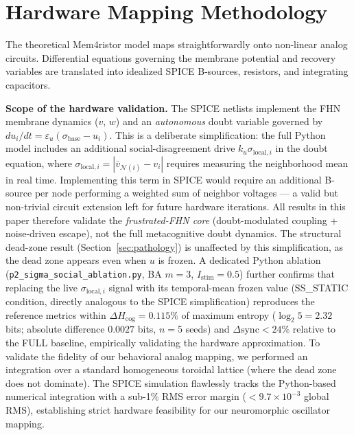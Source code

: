 \documentclass[11pt,a4paper]{article}
\begin{document}
\section{Hardware Mapping Methodology}
\label{sec:methods}
The theoretical Mem4ristor model maps straightforwardly onto non-linear analog circuits. Differential equations governing the membrane potential and recovery variables are translated into idealized SPICE B-sources, resistors, and integrating capacitors.

\textbf{Scope of the hardware validation.} The SPICE netlists implement the FHN membrane dynamics ($v$, $w$) and an \emph{autonomous} doubt variable governed by $du_i/dt = \varepsilon_u(\sigma_{\text{base}} - u_i)$. This is a deliberate simplification: the full Python model includes an additional social-disagreement drive $k_u \sigma_{\text{local},i}$ in the doubt equation, where $\sigma_{\text{local},i} = |\bar{v}_{\mathcal{N}(i)} - v_i|$ requires measuring the neighborhood mean in real time. Implementing this term in SPICE would require an additional B-source per node performing a weighted sum of neighbor voltages --- a valid but non-trivial circuit extension left for future hardware iterations. All results in this paper therefore validate the \emph{frustrated-FHN core} (doubt-modulated coupling + noise-driven escape), not the full metacognitive doubt dynamics. The structural dead-zone result (Section~\ref{sec:pathology}) is unaffected by this simplification, as the dead zone appears even when $u$ is frozen. A dedicated Python ablation (\texttt{p2\_sigma\_social\_ablation.py}, BA $m=3$, $I_{\mathrm{stim}}=0.5$) further confirms that replacing the live $\sigma_{\mathrm{local},i}$ signal with its temporal-mean frozen value (SS\_STATIC condition, directly analogous to the SPICE simplification) reproduces the reference metrics within $\Delta H_{\mathrm{cog}} = 0.115\%$ of maximum entropy ($\log_2 5 = 2.32$ bits; absolute difference $0.0027$ bits, $n=5$ seeds) and $\Delta\mathrm{sync} < 24\%$ relative to the FULL baseline, empirically validating the hardware approximation.
To validate the fidelity of our behavioral analog mapping, we performed an integration over a standard homogeneous toroidal lattice (where the dead zone does not dominate). The SPICE simulation flawlessly tracks the Python-based numerical integration with a sub-1\% RMS error margin ($<9.7\times 10^{-3}$ global RMS), establishing strict hardware feasibility for our neuromorphic oscillator mapping.
\end{document}
